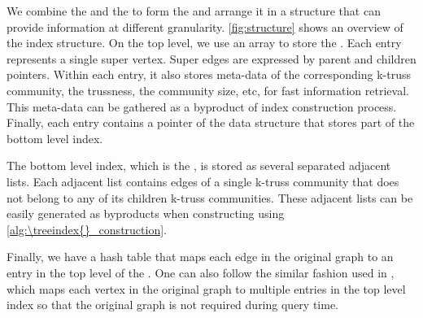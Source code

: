 We combine the \inducedgraph{} and the \treeindex{} to form the \twolevelindex{} and arrange it in a structure that can provide information at different granularity. \autoref{fig:structure} shows an overview of the index structure. On the top level, we use an array to store the \treeindex{}. Each entry represents a single super vertex. Super edges are expressed by parent and children pointers. Within each entry, it also stores meta-data of the corresponding k-truss community, \eg the trussness, the community size, etc, for fast information retrieval. This meta-data can be gathered as a byproduct of index construction process. Finally, each entry contains a pointer of the data structure that stores part of the bottom level index. 

The bottom level index, which is the \inducedgraph{}, is stored as several separated adjacent lists. Each adjacent list contains edges of a single k-truss community that does not belong to any of its children k-truss communities. These adjacent lists can be easily generated as byproducts when constructing \treeindex{} using \autoref{alg:\treeindex{}_construction}. 

Finally, we have a hash table that maps each edge in the original graph to an entry in the top level of the \twolevelindex{}. One can also follow the similar fashion used in \cite{akbas2017truss}, which maps each vertex in the original graph to multiple entries in the top level index so that the original graph is not required during query time.
